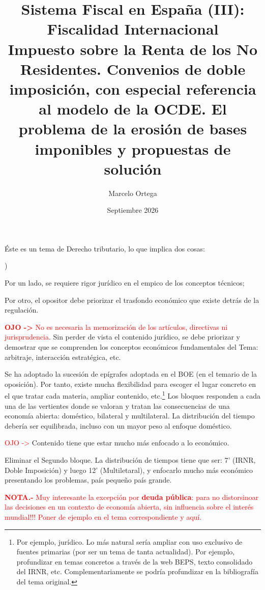 \documentclass[10pt,a4paper]{article}
\title{Sistema Fiscal en España (III): Fiscalidad Internacional\\
\large Impuesto sobre la Renta de los No Residentes. Convenios de doble imposición, con especial referencia al modelo de la OCDE. El problema de la erosión de bases imponibles y propuestas de solución}
\author{Marcelo Ortega}
\date{Septiembre 2026}
\newcounter{alphaitem}
\newcommand{\puntosclave}[1]{%
  \begin{tcolorbox}[
    colframe=black,
    title={Puntos clave},
    before upper={\setlength{\parindent}{0.5cm}\setlength{\parskip}{0.5\baselineskip}}
  ]
  #1
  \end{tcolorbox}
}
\newcommand{\modificaciones}[1]{
  \begin{tcolorbox}[
    colback=white,
    colframe=red,
    title={Modificaciones a realizar},
    before upper={\setlength{\parindent}{0.5cm}\setlength{\parskip}{0.5\baselineskip}}
  ]
  #1
  \end{tcolorbox}
}
\newenvironment{la}
      {\begin{list}{\alph{alphaitem})}{%
          \usecounter{alphaitem}%
          \setlength{\leftmargin}{1cm}%
          \setlength{\parskip}{3pt}%
          \setlength{\itemsep}{0pt}%
          \setlength{\parsep}{0pt}%
      }}
      {\end{list}}
\begin{document}
\maketitle
\newpage

\puntosclave{ %
     Éste es un tema de Derecho tributario, lo que implica dos cosas:
     \begin{la}
         \item Por un lado, se requiere rigor jurídico en el empico de los conceptos técnicos;
         \item Por otro, el opositor debe priorizar el trasfondo económico que existe detrás de la regulación. 
     \end{la}
    
    \textcolor{red}{\textbf{OJO ->} No es necesaria la memorización de los artículos, directivas ni jurisprudencia}. Sin perder de vista el contenido jurídico, se debe priorizar y demostrar que se comprenden los conceptos económicos fundamentales del Tema: arbitraje, interacción estratégica, etc.
    
    Se ha adoptado la sucesión de epígrafes adoptada en el BOE (en el temario de la oposición). Por tanto, existe mucha flexibilidad para escoger el lugar concreto en el que tratar cada materia, ampliar contenido, etc.\footnote{%
        Por ejemplo, jurídico. Lo más natural sería ampliar con uso exclusivo de fuentes primarias (por ser un tema de tanta actualidad). Por ejemplo, profundizar en temas concretos a través de la web BEPS, texto consolidado del IRNR, etc. Complementariamente se podría profundizar en la bibliografía del tema original.
    } Los bloques responden a cada una de las vertientes donde se valoran y tratan las consecuencias de una economía abierta: doméstico, bilateral y multilateral. La distribución del tiempo debería ser equilibrada, incluso con un mayor peso al enfoque doméstico.
    }
\vspace{1cm}

\modificaciones{
    \textcolor{red}{OJO ->} Contenido tiene que estar mucho más enfocado a lo económico.

    Eliminar el Segundo bloque. La distribución de tiempos tiene que ser: 7' (IRNR, Doble Imposición) y luego 12' (Multiletaral), y enfocarlo mucho más económico presentando los problemas, país pequeño país grande. 

    \textcolor{red}{\textbf{NOTA.-} Muy interesante la excepción por \textbf{deuda pública}: para no distorsinoar las decisiones en un contexto de economía abierta, sin influencia sobre el interés mundial!!! Poner de ejemplo en el tema correspondiente y aquí.}
    }
\end{document}
